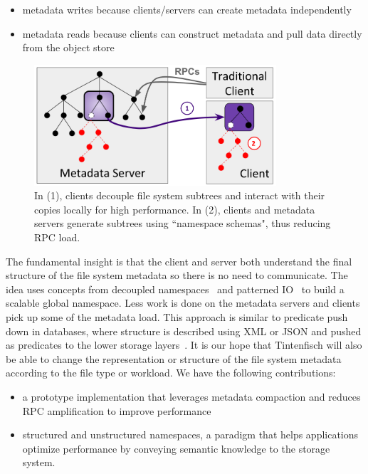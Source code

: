 \begin{itemize}

  \item metadata writes because clients/servers can create metadata
  independently

  \item metadata reads because clients can construct metadata and pull data
  directly from the object store

\end{itemize}

\begin{figure}[t]
  \centering
  \includegraphics[width=90mm]{figures/intro.png}
  \caption{In (1), clients decouple file system subtrees and interact
with their copies locally for high performance. In (2), clients and
metadata servers generate subtrees using ``namespace schemas", thus reducing
RPC load.  \label{fig:intro}}
\end{figure}

The fundamental insight is that the client and server both understand the final
structure of the file system metadata so there is no need to communicate.  The
idea uses concepts from decoupled namespaces~\cite{zheng:pdsw2014-batchfs,
zheng:pdsw2015-deltafs} and patterned IO~\cite{he:hpdc13-plfs-patterns} to
build a scalable global namespace. Less work is done on the metadata servers
and clients pick up some of the metadata load.  This approach is similar to
predicate push down in databases, where structure is described using XML or
JSON and pushed as predicates to the lower storage
layers~\cite{shel:pc17-pushdown}. It is our hope that Tintenfisch will also be
able to change the representation or structure of the file system metadata
according to the file type or workload.  We have the following contributions:

\begin{itemize}

  \item a prototype implementation that leverages metadata compaction and
  reduces RPC amplification to improve performance

  \item structured and unstructured namespaces, a paradigm that helps
  applications optimize performance by conveying semantic knowledge to the
  storage system.

\end{itemize}
